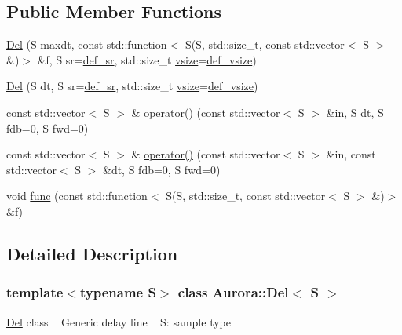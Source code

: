 \subsection*{Public Member Functions}
\begin{DoxyCompactItemize}
\item 
\hyperlink{class_aurora_1_1_del_a9a66ca9cf80ef79c4823bc3c3faf348d}{Del} (S maxdt, const std\+::function$<$ S(S, std\+::size\+\_\+t, const std\+::vector$<$ S $>$ \&)$>$ \&f, S sr=\hyperlink{namespace_aurora_ad49263d809bea98dd422e95bc91bc03e}{def\+\_\+sr}, std\+::size\+\_\+t \hyperlink{class_aurora_1_1_snd_base_af9e21aaf411b17f7a8221c991ce5d291}{vsize}=\hyperlink{namespace_aurora_afaaddf667a06e7ce23c667a8b7295263}{def\+\_\+vsize})
\item 
\hyperlink{class_aurora_1_1_del_ae7ee559e909a215a6d8248d9c9a0ced8}{Del} (S dt, S sr=\hyperlink{namespace_aurora_ad49263d809bea98dd422e95bc91bc03e}{def\+\_\+sr}, std\+::size\+\_\+t \hyperlink{class_aurora_1_1_snd_base_af9e21aaf411b17f7a8221c991ce5d291}{vsize}=\hyperlink{namespace_aurora_afaaddf667a06e7ce23c667a8b7295263}{def\+\_\+vsize})
\item 
const std\+::vector$<$ S $>$ \& \hyperlink{class_aurora_1_1_del_a7061e3fc28fa7c9cace2f194c0c2933b}{operator()} (const std\+::vector$<$ S $>$ \&in, S dt, S fdb=0, S fwd=0)
\item 
const std\+::vector$<$ S $>$ \& \hyperlink{class_aurora_1_1_del_a7b07356cf07e48791929e7c99c907650}{operator()} (const std\+::vector$<$ S $>$ \&in, const std\+::vector$<$ S $>$ \&dt, S fdb=0, S fwd=0)
\item 
void \hyperlink{class_aurora_1_1_del_a45fdbf55fbf2452007d7b8985bbd42ca}{func} (const std\+::function$<$ S(S, std\+::size\+\_\+t, const std\+::vector$<$ S $>$ \&)$>$ \&f)
\end{DoxyCompactItemize}


\subsection{Detailed Description}
\subsubsection*{template$<$typename S$>$\newline
class Aurora\+::\+Del$<$ S $>$}

\hyperlink{class_aurora_1_1_del}{Del} class ~\newline
Generic delay line ~\newline
S\+: sample type 

